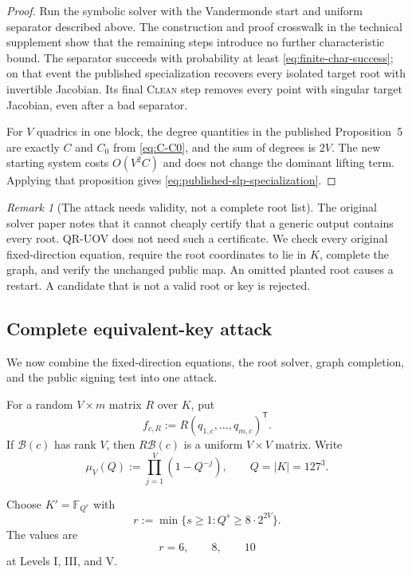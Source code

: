 \documentclass[11pt,a4paper]{article}
\theoremstyle{definition}
\theoremstyle{remark}
\newtheorem{remark}[theorem]{Remark}
\newcommand{\F}{\mathbb F}
\begin{document}
\begin{proof}
Run the symbolic solver with the Vandermonde start and uniform
separator described above.  The construction and proof crosswalk in the
technical supplement show that the remaining steps introduce no further
characteristic bound.  The separator succeeds with probability at least
\eqref{eq:finite-char-success}; on that event the published specialization
recovers every isolated target root with invertible Jacobian.  Its final \textsc{Clean}
step removes every point with singular target Jacobian, even after a bad
separator.

For $V$ quadrics in one block, the degree quantities in the published
Proposition~5 are exactly $C$ and $C_0$ from \eqref{eq:C-C0}, and the sum of
degrees is $2V$.  The new starting system costs $O(V^2C)$ and does not change
the dominant lifting term.  Applying that proposition gives
\eqref{eq:published-slp-specialization}.
\end{proof}

\begin{remark}[The attack needs validity, not a complete root list]\label{rem:one-sided-enough}
The original solver paper notes that it cannot cheaply certify that a generic
output contains every root.  QR-UOV does not need such a certificate.  We
check every original fixed-direction equation, require the root coordinates to lie
in $K$, complete the graph, and verify the unchanged public map.  An omitted
planted root causes a restart.  A candidate that is not a valid root or key is
rejected.
\end{remark}

\subsection{Complete equivalent-key attack}

We now combine the fixed-direction equations, the root solver, graph completion,
and the public signing test into one attack.

For a random $V\times m$ matrix $R$ over $K$, put
\[
 f_{c,R}:=R(q_{1,c},\ldots,q_{m,c})^{\mathsf T}.
\]
If $\mathcal B(c)$ has rank $V$, then $R\mathcal B(c)$ is a uniform $V\times V$ matrix.  Write
\begin{equation}\label{eq:mu-square}
 \mu_V(Q):=\prod_{j=1}^V(1-Q^{-j}),
 \qquad Q=|K|=127^3.
\end{equation}

Choose $K'=\F_{Q^r}$ with
\begin{equation}\label{eq:r-choice}
 r:=\min\{s\ge1:Q^s\ge8\cdot2^{2V}\}.
\end{equation}
The values are
\begin{equation}\label{eq:r-values}
 r=6,\qquad8,\qquad10
\end{equation}
at Levels I, III, and V.
\end{document}
